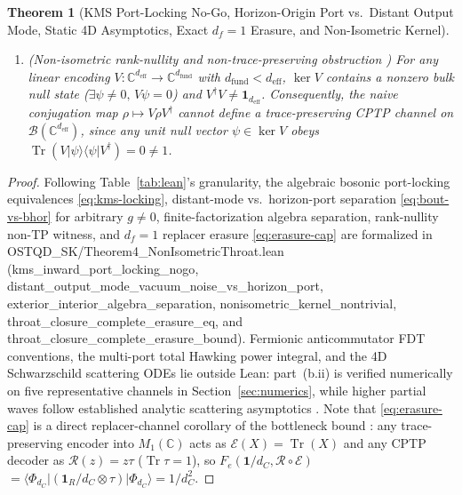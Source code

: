 \documentclass[11pt,a4paper]{article}
\newtheorem{theorem}{Theorem}
\theoremstyle{definition}
\theoremstyle{remark}
\newcommand{\Tr}{\operatorname{Tr}}
\newcommand{\cE}{\mathcal{E}}
\newcommand{\cR}{\mathcal{R}}
\newcommand{\bbC}{\mathbb{C}}
\newcommand{\1}{\mathbf{1}}
\newcommand{\code}[1]{{\scriptsize\ttfamily #1}}
\begin{document}
\begin{theorem}[KMS Port-Locking No-Go, Horizon-Origin Port vs.\ Distant Output Mode, Static 4D Asymptotics, Exact $d_f=1$ Erasure, and Non-Isometric Kernel]
\begin{enumerate}
\begin{enumerate}
  \end{enumerate}
  \item[(c)] \emph{(Non-isometric rank-nullity and non-trace-preserving obstruction \cite{Akers2022})} For any linear encoding $V:\bbC^{d_{\mathrm{eff}}}\to\bbC^{d_{\mathrm{fund}}}$ with $d_{\mathrm{fund}} < d_{\mathrm{eff}}$, $\ker V$ contains a nonzero bulk null state ($\exists\psi\neq 0,\,V\psi=0$) and $V^\dagger V \neq \1_{d_{\mathrm{eff}}}$. Consequently, the naive conjugation map $\rho\mapsto V\rho V^\dagger$ cannot define a trace-preserving CPTP channel on $\mathcal{B}(\bbC^{d_{\mathrm{eff}}})$, since any unit null vector $\psi\in\ker V$ obeys $\Tr(V|\psi\rangle\langle\psi|V^\dagger)=0\neq 1$.
\end{enumerate}
\end{theorem}

\begin{proof}
Following Table~\ref{tab:lean}'s granularity, the algebraic bosonic port-locking equivalences \eqref{eq:kms-locking}, distant-mode vs.\ horizon-port separation \eqref{eq:bout-vs-bhor} for arbitrary $g\neq 0$, finite-factorization algebra separation, rank-nullity non-TP witness, and $d_f=1$ replacer erasure \eqref{eq:erasure-cap} are formalized in \code{OSTQD\_\allowbreak SK/\allowbreak Theorem4\_\allowbreak Non\allowbreak Isometric\allowbreak Throat.\allowbreak lean} (\code{kms\_\allowbreak in\allowbreak ward\_\allowbreak port\_\allowbreak lock\allowbreak ing\_\allowbreak nogo}, \code{dis\allowbreak tant\_\allowbreak out\allowbreak put\_\allowbreak mode\_\allowbreak vac\allowbreak uum\_\allowbreak noise\_\allowbreak vs\_\allowbreak hori\allowbreak zon\_\allowbreak port}, \code{exter\allowbreak ior\_\allowbreak inter\allowbreak ior\_\allowbreak alge\allowbreak bra\_\allowbreak sepa\allowbreak ration}, \code{non\allowbreak iso\allowbreak metric\_\allowbreak ker\allowbreak nel\_\allowbreak non\allowbreak trivial}, \code{throat\_\allowbreak clo\allowbreak sure\_\allowbreak com\allowbreak plete\_\allowbreak era\allowbreak sure\_\allowbreak eq}, and \code{throat\_\allowbreak clo\allowbreak sure\_\allowbreak com\allowbreak plete\_\allowbreak era\allowbreak sure\_\allowbreak bound}). Fermionic anticommutator FDT conventions, the multi-port total Hawking power integral, and the 4D Schwarzschild scattering ODEs lie outside Lean: part~(b.ii) is verified numerically on five representative channels in Section~\ref{sec:numerics}, while higher partial waves follow established analytic scattering asymptotics \cite{Unruh1976Abs,Page1976,DasGibbonsMathur1997,GoldbergerRothstein2006,Crispino2007}. Note that \eqref{eq:erasure-cap} is a direct replacer-channel corollary of the bottleneck bound \cite{Soga2026OSTQD,FarberGour2026}: any trace-preserving encoder into $M_1(\bbC)$ acts as $\cE(X)=\Tr(X)$ and any CPTP decoder as $\cR(z)=z\tau$ ($\Tr\tau=1$), so $F_e(\1/d_C,\cR\circ\cE)$ $=\langle\Phi_{d_C}|(\1_R/d_C\otimes\tau)|\Phi_{d_C}\rangle = 1/d_C^2$.
\end{proof}
\end{document}
